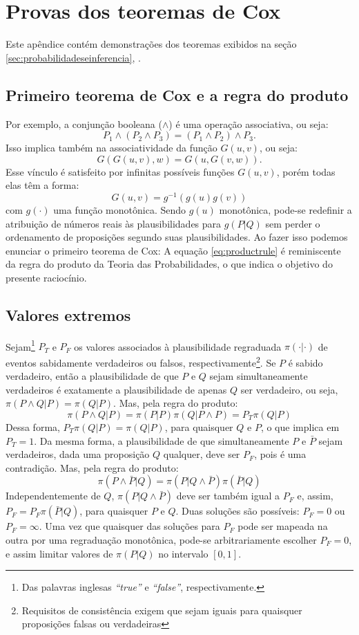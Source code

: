\chapter{Provas dos teoremas de Cox}
\label{ap:provateoremas}

Este apêndice contém demonstrações dos teoremas exibidos na seção \ref{sec:probabilidadeseinferencia}, \emph{}.

\section{Primeiro teorema de Cox e a regra do produto} \clarificationneeded\newline
Por exemplo, a conjunção booleana ($\wedge$) é uma operação associativa, ou seja:
\[
  P_1\wedge (P_2 \wedge P_3) =  (P_1\wedge P_2) \wedge P_3.
\] 
Isso implica também na associatividade da função $G(u,v)$, ou seja:
\[
  G(G(u,v),w) = G(u,G(v,w)). 
\]
Esse vínculo é satisfeito por infinitas possíveis funções $G(u,v)$, porém todas elas \cite{Aczel1975, ACaticha2008} têm a forma:
\[
  G(u,v)  = g^{-1}(g(u) g(v)) 
\]
com $g(\cdot)$ uma função monotônica. Sendo $g(u)$ monotônica, pode-se redefinir a atribuição de números reais às plausibilidades para $g(P|Q)$ sem perder o ordenamento de proposições segundo suas plausibilidades. Ao fazer isso podemos enunciar o primeiro teorema de Cox:
A equação \eqref{eq:productrule} é reminiscente da regra do produto da Teoria das Probabilidades, o que indica o objetivo do presente raciocínio. 

\section{Valores extremos} \clarificationneeded\newline
Sejam\footnote{Das palavras inglesas \emph{``true''} e \emph{``false''}, respectivamente.} $P_T$ e $P_F$ os valores associados à plausibilidade regraduada $\pi(\cdot| \cdot)$ de eventos sabidamente verdadeiros ou falsos, respectivamente\footnote{Requisitos de consistência exigem que sejam iguais para quaisquer proposições falsas ou verdadeiras}. Se $P$ é sabido verdadeiro, então a plausibilidade de que $P$ e $Q$ sejam simultaneamente verdadeiros é exatamente a plausibilidade de apenas $Q$ ser verdadeiro, ou seja, $\pi(P\wedge Q|P) = \pi(Q|P)$. Mas, pela regra do produto:
\[
 \pi(P\wedge Q|P) = \pi(P|P) \pi(Q|P\wedge P) = P_T \pi(Q|P) 
\]
Dessa forma, $P_T \pi(Q|P) = \pi(Q|P)$, para quaisquer $Q$ e $P$, o que implica em $P_T = 1$. Da mesma forma, a plausibilidade de que simultaneamente $P$ e $\bar{P}$ sejam verdadeiros, dada uma proposição $Q$ qualquer, deve ser $P_F$, pois é uma contradição. Mas, pela regra do produto:
\[
 \pi(P\wedge\bar{P}|Q) = \pi(P | Q\wedge\bar{P}) \pi(\bar{P}|Q)
\]
Independentemente de $Q$, $\pi(P|Q\wedge\bar{P})$ deve ser também igual a $P_F$ e, assim, $P_F = P_F \pi(\bar{P}|Q)$, para quaisquer $P$ e $Q$. Duas soluções são possíveis: $P_F = 0$ ou $P_F = \infty$. Uma vez que quaisquer das soluções para $P_F$ pode ser mapeada na outra por uma regraduação monotônica, pode-se arbitrariamente escolher $P_F = 0$, e assim limitar valores de $\pi(P|Q)$ no intervalo $[0,1]$. 

